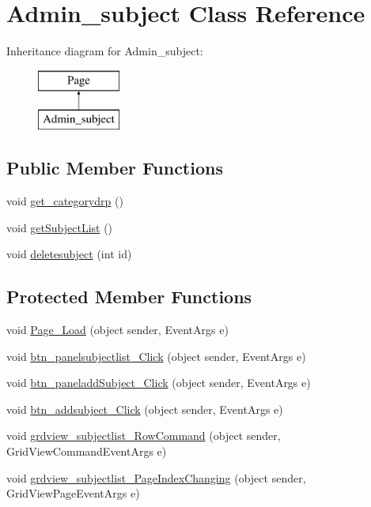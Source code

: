 \hypertarget{class_admin__subject}{}\section{Admin\+\_\+subject Class Reference}
\label{class_admin__subject}
Inheritance diagram for Admin\+\_\+subject\+:\begin{figure}[H]
\begin{center}
\leavevmode
\includegraphics[height=2.000000cm]{class_admin__subject}
\end{center}
\end{figure}
\subsection*{Public Member Functions}
\begin{DoxyCompactItemize}
\item 
void \mbox{\hyperlink{class_admin__subject_ad07aff857c5c54703e973ef06a1340db}{get\+\_\+categorydrp}} ()
\item 
void \mbox{\hyperlink{class_admin__subject_aab230cac3f6b3746084289baf427a422}{get\+Subject\+List}} ()
\item 
void \mbox{\hyperlink{class_admin__subject_aa75e5948082eb3ec007017a2b1b98d14}{deletesubject}} (int id)
\end{DoxyCompactItemize}
\subsection*{Protected Member Functions}
\begin{DoxyCompactItemize}
\item 
void \mbox{\hyperlink{class_admin__subject_a27d58632afbcc5e4d08398c0a6ef1c39}{Page\+\_\+\+Load}} (object sender, Event\+Args e)
\item 
void \mbox{\hyperlink{class_admin__subject_a6ed0addaa47e2d155c34b92a806a34b5}{btn\+\_\+panelsubjectlist\+\_\+\+Click}} (object sender, Event\+Args e)
\item 
void \mbox{\hyperlink{class_admin__subject_a906f8fd9b9274da7e385357b996d3a9c}{btn\+\_\+paneladd\+Subject\+\_\+\+Click}} (object sender, Event\+Args e)
\item 
void \mbox{\hyperlink{class_admin__subject_a53842a13d43e75d65ac304479139aad3}{btn\+\_\+addsubject\+\_\+\+Click}} (object sender, Event\+Args e)
\item 
void \mbox{\hyperlink{class_admin__subject_afe7e1298f10bce86189b5a9ab68b8622}{grdview\+\_\+subjectlist\+\_\+\+Row\+Command}} (object sender, Grid\+View\+Command\+Event\+Args e)
\item 
void \mbox{\hyperlink{class_admin__subject_a3b27304f2b8f11807712f5946fe3e9cb}{grdview\+\_\+subjectlist\+\_\+\+Page\+Index\+Changing}} (object sender, Grid\+View\+Page\+Event\+Args e)
\end{DoxyCompactItemize}
